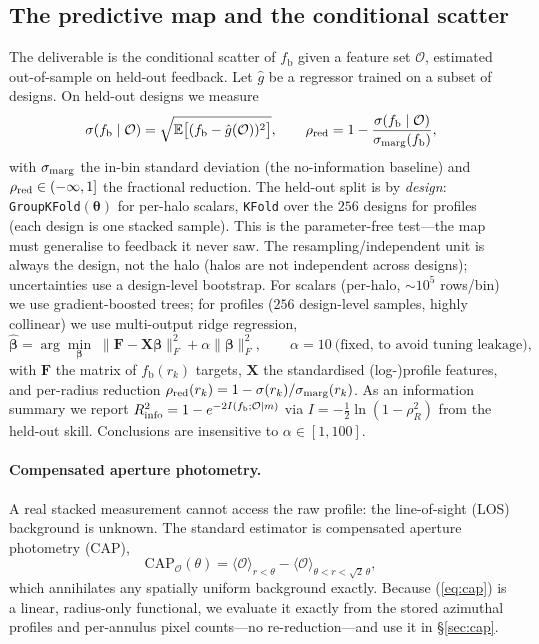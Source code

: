 \documentclass[11pt]{article}
\newcommand{\fb}{f_{\mathrm{b}}}
\newcommand{\E}{\mathbb{E}}
\newcommand{\thetav}{\bm{\theta}}
\begin{document}
\subsection{The predictive map and the conditional scatter}
\label{sec:map}
The deliverable is the conditional scatter of $\fb$ given a feature set
$\mathcal{O}$, estimated out-of-sample on held-out feedback. Let $\hat g$ be a
regressor trained on a subset of designs. On held-out designs we measure
\begin{equation}
\sigma(\fb\mid\mathcal{O}) = \sqrt{\E\big[(\fb-\hat g(\mathcal{O}))^2\big]},\qquad
\rho_{\rm red}=1-\frac{\sigma(\fb\mid\mathcal{O})}{\sigma_{\rm marg}(\fb)},
\end{equation}
with $\sigma_{\rm marg}$ the in-bin standard deviation (the no-information baseline)
and $\rho_{\rm red}\in(-\infty,1]$ the fractional reduction. The held-out split is by
\emph{design}: \texttt{GroupKFold}$(\thetav)$ for per-halo scalars,
\texttt{KFold} over the $256$ designs for profiles (each design is one stacked
sample). This is the parameter-free test---the map must generalise to feedback it
never saw. The resampling/independent unit is always the design, not the halo
(halos are not independent across designs); uncertainties use a design-level
bootstrap. For scalars (per-halo, $\sim10^5$ rows/bin) we use gradient-boosted trees;
for profiles ($256$ design-level samples, highly collinear) we use multi-output ridge
regression,
\begin{equation}
\hat{\bm{\beta}}=\arg\min_{\bm{\beta}}\;\|\bm{F}-\bm{X}\bm{\beta}\|_F^2+\alpha\|\bm{\beta}\|_F^2,
\qquad \alpha=10\ \text{(fixed, to avoid tuning leakage)},
\end{equation}
with $\bm{F}$ the matrix of $\fb(r_k)$ targets, $\bm{X}$ the standardised
(log-)profile features, and per-radius reduction
$\rho_{\rm red}(r_k)=1-\sigma(r_k)/\sigma_{\rm marg}(r_k)$. As an information
summary we report $R^2_{\rm info}=1-e^{-2I(\fb;\mathcal{O}\mid m)}$ via
$I=-\tfrac12\ln(1-\rho^2_{R})$ from the held-out skill. Conclusions are insensitive
to $\alpha\in[1,100]$.

\paragraph{Compensated aperture photometry.}
A real stacked measurement cannot access the raw profile: the line-of-sight (LOS)
background is unknown. The standard estimator is compensated aperture photometry
(CAP),
\begin{equation}
\mathrm{CAP}_\mathcal{O}(\theta)=\big\langle \mathcal{O}\big\rangle_{r<\theta}
-\big\langle \mathcal{O}\big\rangle_{\theta<r<\sqrt{2}\,\theta},
\label{eq:cap}
\end{equation}
which annihilates any spatially uniform background exactly. Because (\ref{eq:cap}) is
a linear, radius-only functional, we evaluate it exactly from the stored azimuthal
profiles and per-annulus pixel counts---no re-reduction---and use it in
\S\ref{sec:cap}.
\end{document}
